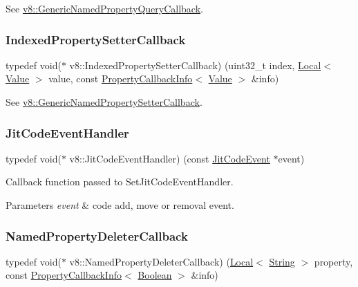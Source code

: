See {\ttfamily \mbox{\hyperlink{namespacev8_add9f7ab11e4a9a2b9ad2c4536b0e1a64}{v8\+::\+Generic\+Named\+Property\+Query\+Callback}}}. \mbox{\label{namespacev8_a4ac7cc6185ebc8b6a199f9fa8e6bf5c3}} 
\subsubsection{\texorpdfstring{Indexed\+Property\+Setter\+Callback}{IndexedPropertySetterCallback}}
{\footnotesize\ttfamily typedef void($\ast$ v8\+::\+Indexed\+Property\+Setter\+Callback) (uint32\+\_\+t index, \mbox{\hyperlink{classv8_1_1Local}{Local}}$<$ \mbox{\hyperlink{classv8_1_1Value}{Value}} $>$ value, const \mbox{\hyperlink{classv8_1_1PropertyCallbackInfo}{Property\+Callback\+Info}}$<$ \mbox{\hyperlink{classv8_1_1Value}{Value}} $>$ \&info)}

See {\ttfamily \mbox{\hyperlink{namespacev8_af74716c6e95a269c6cd4314662fd0a7e}{v8\+::\+Generic\+Named\+Property\+Setter\+Callback}}}. \mbox{\label{namespacev8_a39243bc91e63d64d111452fdb98c4733}} 
\subsubsection{\texorpdfstring{Jit\+Code\+Event\+Handler}{JitCodeEventHandler}}
{\footnotesize\ttfamily typedef void($\ast$ v8\+::\+Jit\+Code\+Event\+Handler) (const \mbox{\hyperlink{structv8_1_1JitCodeEvent}{Jit\+Code\+Event}} $\ast$event)}

Callback function passed to Set\+Jit\+Code\+Event\+Handler.


\begin{DoxyParams}{Parameters}
{\em event} & code add, move or removal event. \\
\hline
\end{DoxyParams}
\mbox{\label{namespacev8_aaba861076c5b111912cfa0791d348437}} 
\subsubsection{\texorpdfstring{Named\+Property\+Deleter\+Callback}{NamedPropertyDeleterCallback}}
{\footnotesize\ttfamily typedef void($\ast$ v8\+::\+Named\+Property\+Deleter\+Callback) (\mbox{\hyperlink{classv8_1_1Local}{Local}}$<$ \mbox{\hyperlink{classv8_1_1String}{String}} $>$ property, const \mbox{\hyperlink{classv8_1_1PropertyCallbackInfo}{Property\+Callback\+Info}}$<$ \mbox{\hyperlink{classv8_1_1Boolean}{Boolean}} $>$ \&info)}

